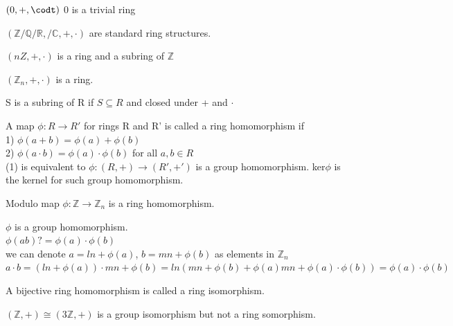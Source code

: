 \documentclass{article}
\newcommand\R{\ensuremath{\mathbb{R}}}
\newcommand\Z{\ensuremath{\mathbb{Z}}}
\newcommand\Q{\ensuremath{\mathbb{Q}}}
\newcommand\C{\ensuremath{\mathbb{C}}}
\begin{document}
\begin{Example}
    $(0, +, \codt)$ 0 is a trivial ring
\end{Example}

\begin{Example}
    $(\Z / \Q / \R, /\C, + , \cdot)$ are standard ring structures. 
\end{Example}

\begin{Example}
    $(nZ, +, \cdot)$ is a ring and a subring of $\Z$
\end{Example}

\begin{Example}
    $(\Z_n, +, \cdot)$ is a ring.
\end{Example}


\begin{def}
    S is a subring of R if $S\subseteq R$ and closed under + and $\cdot$
\end{def}

\begin{Def}
    A map $\phi: R \rightarrow R'$ for rings R and R' is called a ring homomorphism  if 
    \\1)  $\phi (a+b) = \phi(a) + \phi(b)$
    \\2) $\phi (a \cdot b ) = \phi(a) \cdot \phi(b)$ for all $a, b \in R$
    \\(1) is equivalent to $\phi:(R, +) \rightarrow (R', +') $ is a group homomorphism. ker$\phi$ is the kernel for such group homomorphism. 
\end{Def}

\begin{Example}
    Modulo map $\phi :\Z \rightarrow \Z_n $ is a ring homomorphism. 
\end{Example}

\begin{Proof}
    $\phi$ is a group homomorphism.
    \\ $\phi(ab) ?= \phi(a) \cdot \phi(b)$
    \\ we can denote $a = ln + \phi(a)$, $b = mn + \phi(b)$ as elements in $\Z_n$
    \\ $a \cdot b = (ln + \phi(a)) \cdot mn + \phi(b) = ln(mn + \phi(b)+\phi(a)mn + \phi(a)\cdot \phi(b)) = \phi(a)\cdot \phi(b) $    
\end{Proof}

\newpage
\begin{Def}
    A bijective ring homomorphism is called a ring isomorphism.
\end{Def}
\begin{Example}
    $(\Z, +) \cong (3\Z,+)$ is a group isomorphism but not a ring somorphism. 
\end{Example}
\end{document}
